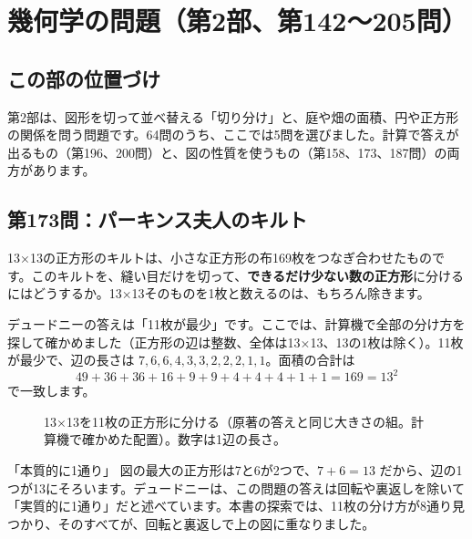 \documentclass[a4paper,11pt,openany]{ltjsbook}
\begin{document}
\chapter{幾何学の問題（第2部、第142〜205問）}

\section{この部の位置づけ}

第2部は、図形を切って並べ替える「切り分け」と、庭や畑の面積、円や正方形の関係を問う問題です。64問のうち、ここでは5問を選びました。計算で答えが出るもの（第196、200問）と、図の性質を使うもの（第158、173、187問）の両方があります。

\section{第173問：パーキンス夫人のキルト}

13×13の正方形のキルトは、小さな正方形の布169枚をつなぎ合わせたものです。このキルトを、縫い目だけを切って、\textbf{できるだけ少ない数の正方形}に分けるにはどうするか。13×13そのものを1枚と数えるのは、もちろん除きます。

デュードニーの答えは「11枚が最少」です。ここでは、計算機で全部の分け方を探して確かめました（正方形の辺は整数、全体は13×13、13の1枚は除く）。11枚が最少で、辺の長さは $7,6,6,4,3,3,2,2,2,1,1$。面積の合計は
\[
49+36+36+16+9+9+4+4+4+1+1=169=13^2
\]
で一致します。

\begin{figure}[htbp]
\centering
{}
\caption{13×13を11枚の正方形に分ける（原著の答えと同じ大きさの組。計算機で確かめた配置）。数字は1辺の長さ。}
\end{figure}

\begin{pointbox}{「本質的に1通り」}
図の最大の正方形は7と6が2つで、$7+6=13$ だから、辺の1つが13にそろいます。デュードニーは、この問題の答えは回転や裏返しを除いて「実質的に1通り」だと述べています。本書の探索では、11枚の分け方が8通り見つかり、そのすべてが、回転と裏返しで上の図に重なりました。
\end{pointbox}
\end{document}
